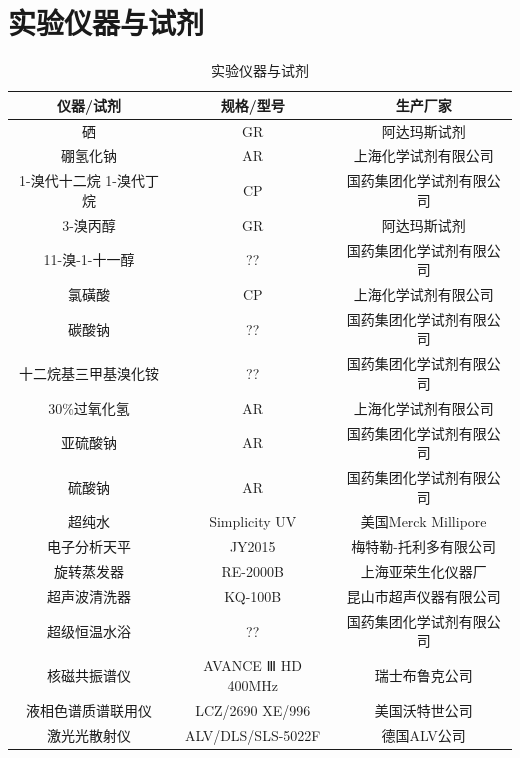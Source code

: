 \documentclass[bachelor,fandolfonts,replaceperiod]{jnuthesis} %
\begin{document}
    \section{实验仪器与试剂}
        \begin{table}[htp]
        \centering
        \begin{tabular}{ccc}
            \toprule
            \textbf{仪器/试剂} & \textbf{规格/型号} & \textbf{生产厂家} \\
            \midrule
            硒   & GR & 阿达玛斯试剂 \\
            硼氢化钠  & AR  & 上海化学试剂有限公司 \\
            1-溴代十二烷
            1-溴代丁烷  & CP & 国药集团化学试剂有限公司 \\
            3-溴丙醇 & GR & 阿达玛斯试剂 \\
            11-溴-1-十一醇 & ?? & 国药集团化学试剂有限公司 \\
            氯磺酸  & CP & 上海化学试剂有限公司 \\
            碳酸钠  & ?? & 国药集团化学试剂有限公司 \\
            十二烷基三甲基溴化铵 & ?? & 国药集团化学试剂有限公司\\
            30\%过氧化氢  & AR & 上海化学试剂有限公司 \\
            亚硫酸钠  & AR & 国药集团化学试剂有限公司 \\
            硫酸钠  & AR & 国药集团化学试剂有限公司 \\
            超纯水 & Simplicity\ce{^{\textregistered}} UV & 美国Merck Millipore\\
            电子分析天平  & JY2015 & 梅特勒-托利多有限公司 \\
            旋转蒸发器  & RE-2000B & 上海亚荣生化仪器厂 \\
            超声波清洗器  & KQ-100B & 昆山市超声仪器有限公司 \\
            超级恒温水浴  & ?? & 国药集团化学试剂有限公司 \\
            核磁共振谱仪  & AVANCE Ⅲ HD 400MHz & 瑞士布鲁克公司 \\
            液相色谱质谱联用仪  & LCZ/2690 XE/996 & 美国沃特世公司 \\
            激光光散射仪 & ALV/DLS/SLS-5022F & 德国ALV公司\\
            \bottomrule
        \end{tabular}
        \caption{实验仪器与试剂}\label{table:实验仪器与试剂}
    \end{table}
\end{document}
